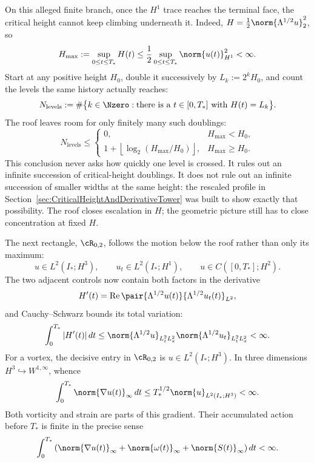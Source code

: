 On this alleged finite branch, once the \(H^1\) trace reaches the terminal face,
the critical height cannot keep climbing underneath it.  Indeed,
\(H=\tfrac12\norm{\Lambda^{1/2}u}_2^2\), so
\begin{equation}\label{eq:BodyCriticalHeightRoof}
  H_{\max}
  :=\sup_{0\leq t\leq T_*}H(t)
  \leq\frac12\sup_{0\leq t\leq T_*}\norm{u(t)}_{H^1}^2
  <\infty.
\end{equation}
Start at any positive height \(H_0\), double it successively by
\(L_k:=2^kH_0\), and count the levels the same history actually reaches:
\[
  N_{\mathrm{levels}}
  :=
  \#\bigl\{k\in\Nzero:\text{there is a }t\in[0,T_*]\text{ with }H(t)=L_k\bigr\}.
\]
The roof leaves room for only finitely many such doublings:
\begin{equation}\label{eq:BodyFiniteZenoOctaveCount}
  N_{\mathrm{levels}}
  \leq
  \begin{cases}
    0,&H_{\max}<H_0,\\
    1+\left\lfloor\log_2(H_{\max}/H_0)\right\rfloor,
      &H_{\max}\geq H_0.
  \end{cases}
\end{equation}
This conclusion never asks how quickly one level is crossed.  It rules out an
infinite succession of critical-height doublings.  It does not rule out an
infinite succession of smaller widths at the same height: the rescaled profile
in Section~\ref{sec:CriticalHeightAndDerivativeTower} was built to show exactly
that possibility.  The roof closes escalation in \(H\); the geometric picture
still has to close concentration at fixed \(H\).

The next rectangle, \(\cR_{0,2}\), follows the motion below the roof rather than
only its maximum:
\begin{equation}\label{eq:LowRectangleZeroTwo}
  u\in L^2(I_*;H^3),
  \qquad
  u_t\in L^2(I_*;H^1),
  \qquad
  u\in C([0,T_*];H^2).
\end{equation}
The two adjacent controls now contain both factors in the derivative
\[
  H'(t)
  =\operatorname{Re}
  \pair{\Lambda^{1/2}u(t)}{\Lambda^{1/2}u_t(t)}_{L^2},
\]
and Cauchy--Schwarz bounds its total variation:
\begin{equation}\label{eq:CriticalHeightTotalVariationBound}
  \int_0^{T_*}|H'(t)|\,dt
  \leq
  \norm{\Lambda^{1/2}u}_{L^2_tL^2_x}
  \norm{\Lambda^{1/2}u_t}_{L^2_tL^2_x}
  <\infty.
\end{equation}
For a vortex, the decisive entry in \(\cR_{0,2}\) is
\(u\in L^2(I_*;H^3)\).  In three dimensions
\(H^3\hookrightarrow W^{1,\infty}\), whence
\[
  \int_0^{T_*}\norm{\nabla u(t)}_\infty\,dt
  \leq
  T_*^{1/2}\norm{u}_{L^2(I_*;H^3)}<\infty.
\]
Both vorticity and strain are parts of this gradient.  Their accumulated action
before \(T_*\) is finite in the precise sense
\begin{equation}\label{eq:FiniteLipschitzVorticityStrainAction}
  \int_0^{T_*}
  \left(
    \norm{\nabla u(t)}_\infty
    +\norm{\omega(t)}_\infty
    +\norm{S(t)}_\infty
  \right)dt
  <\infty.
\end{equation}


